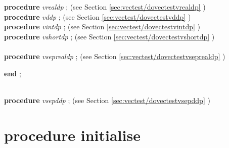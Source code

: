 \documentclass[10pt, a4paper]{article}
\begin{document}
\begin{tabbing}
\<\textsf{\textbf{procedure}  \textit{vrealdp} ;} (see Section \ref{sec:vectest/dovectestvrealdp} )\\
\<\textsf{\textbf{procedure}  \textit{vddp} ;} (see Section \ref{sec:vectest/dovectestvddp} )\\
\<\textsf{\textbf{procedure}  \textit{vintdp} ;} (see Section \ref{sec:vectest/dovectestvintdp} )\\
\<\textsf{\textbf{procedure}  \textit{vshortdp} ;} (see Section \ref{sec:vectest/dovectestvshortdp} )\\
\\
\<\textsf{\textbf{procedure}  \textit{vseprealdp} ;} (see Section \ref{sec:vectest/dovectestvseprealdp} )\\
\<\-\parbox{14cm}{\textsf{\textbf{end} ;}}\\
\textsf{\textbf{procedure}  \textit{vsepddp} ;} (see Section \ref{sec:vectest/dovectestvsepddp} )\\
\end{tabbing}
\section{procedure initialise}\label{sec:vectest/dovectestinitialise}
\end{document}
